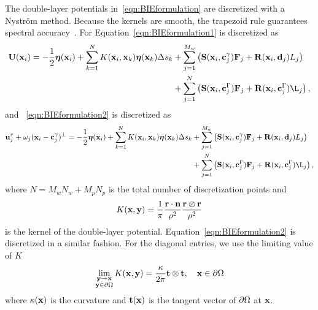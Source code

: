 \documentclass[preprint, 10pt]{elsarticle}
\begin{document}
The double-layer potentials in~\eqref{eqn:BIEformulation} are
discretized with a Nystr\"om method.  Because the kernels are smooth,
the trapezoid rule guarantees spectral accuracy~\cite{Trefethan2014}.  For
Equation~\eqref{eqn:BIEformulation1} is discretized as
\begin{equation*}
  \begin{aligned}
  \UU(\xx_i) = -\frac{1}{2}\eeta(\xx_i) + 
  \sum_{k=1}^{N} K(\xx_i,\xx_k) \eeta(\xx_k) \Delta s_k
    &+ \sum_{j=1}^{M_w} \left(\mathbf{S}(\xx_i,\cc^\gamma_j)\FF_j +
    \mathbf{R}(\xx_i,\dd_j)L_j\right)  \\
    &+ \sum_{j=1}^{N} \left(\mathbf{S}(\xx_i,\cc^\Gamma_j)\FF_j +
    \mathbf{R}(\xx_i,\cc^\Gamma_j)\L_j\right),
  \end{aligned}
\end{equation*}
and ~\eqref{eqn:BIEformulation2} is discretized as
\begin{equation*}
  \begin{aligned}
\uu^\tau_j + \omega_j(\xx_i - \cc^\gamma_j)^\perp = -\frac{1}{2}\eeta(\xx_i) +
\sum_{k=1}^{N} K(\xx_i,\xx_k) \eeta(\xx_k) \Delta s_k
    &+ \sum_{j=1}^{M_w} \left(\mathbf{S}(\xx_i,\cc^\gamma_j)\FF_j +
    \mathbf{R}(\xx_i,\dd_j)L_j\right)  \\
    &+ \sum_{j=1}^{N} \left(\mathbf{S}(\xx_i,\cc^\Gamma_j)\FF_j +
    \mathbf{R}(\xx_i,\cc^\Gamma_j)\L_j\right),
  \end{aligned}
\end{equation*}
where $N = M_w N_w + M_p N_p$ is the total number of discretization
points and
\begin{align*}
  K({\mathbf{x}},{\mathbf{y}}) = \frac{1}{\pi} \frac{{\mathbf{r}} \cdot {\mathbf{n}}}{\rho^2} 
               \frac{{\mathbf{r}} \otimes {\mathbf{r}}}{\rho^2}
\end{align*}
is the kernel of the double-layer potential.
Equation~\eqref{eqn:BIEformulation2} is discretized in a similar
fashion.  For the diagonal entries, we use the limiting value of $K$
\begin{align*}
  \lim_{\substack{{\mathbf{y}} \rightarrow {\mathbf{x}} \\ {\mathbf{y}} \in {\partial}\Omega}} 
    K({\mathbf{x}},{\mathbf{y}}) = \frac{\kappa}{2\pi}{\mathbf{t}}\otimes{\mathbf{t}},
    \quad {\mathbf{x}} \in {\partial}\Omega
\end{align*}
where $\kappa({\mathbf{x}})$ is the curvature and ${\mathbf{t}}({\mathbf{x}})$ is the tangent
vector of ${\partial}\Omega$ at ${\mathbf{x}}$.
\end{document}
